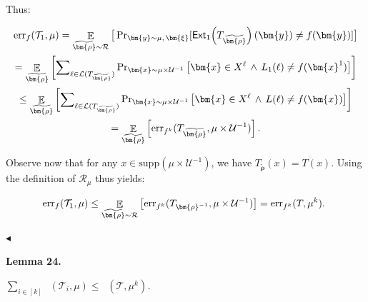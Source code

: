 Thus:\par


\[\begin{gathered}
\displaystyle\mathrm{err}_{f}(\mathcal{T}_{1},\mu) \displaystyle=\mathop{\mathbb{E}}_{\widetilde{\bm{\rho}}\sim\mathcal{R}}\big{[}\Pr\nolimits_{\bm{y}\sim\mu,\,\bm{\xi}}[\mathsf{Ext}_{1}\mathopen{}\left(T_{\widetilde{\bm{\rho}}}\mathclose{}\right)(\bm{y})\neq f(\bm{y})]\big{]} \\
\displaystyle=\mathop{\mathbb{E}}_{\widetilde{\bm{\rho}}}\left[\sum\nolimits_{\ell\in\mathcal{L}(T_{\widetilde{\bm{\rho}}})}\Pr\nolimits_{\bm{x}\sim\mu\times\mathcal{U}^{-1}}\big{[}\bm{x}\in X^{\ell}\,\wedge\,L_{1}(\ell)\neq f(\bm{x}^{1})\big{]}\right] \\
\displaystyle\leq\mathop{\mathbb{E}}_{\widetilde{\bm{\rho}}}\left[\sum\nolimits_{\ell\in\mathcal{L}(T_{\widetilde{\bm{\rho}}})}\Pr\nolimits_{\bm{x}\sim\mu\times\mathcal{U}^{-1}}\big{[}\bm{x}\in X^{\ell}\,\wedge\,L(\ell)\neq f(\bm{x})\big{]}\right] \\
\displaystyle=\mathop{\mathbb{E}}_{\widetilde{\bm{\rho}}}\left[\mathrm{err}_{f^{k}}(T_{\widetilde{\bm{\rho}}},\mu\times\mathcal{U}^{-1})\right].
\end{gathered}\]


Observe now that for any $x\in\mathrm{supp}(\mu\times\mathcal{U}^{-1})$, we have $T_{\widetilde{\bm{\rho}}}(x)=T(x)$. Using the definition of $\mathcal{R}_{\mu}$ thus yields:\par


\[\begin{gathered}
\mathrm{err}_{f}(\mathcal{T}_{1},\mu)\leq\mathop{\mathbb{E}}_{\widetilde{\bm{\rho}}\sim\mathcal{R}}\big{[}\mathrm{err}_{f^{k}}(T_{\bm{\rho}^{-1}},\mu\times\mathcal{U}^{-1})\big{]}=\mathrm{err}_{f^{k}}(T,\mu^{k}).\
\end{gathered}\]


$\blacktriangleleft$\par





\par\medskip\noindent\textbf{
\textbf{Lemma 24}\textbf{.}
}\par



$\sum_{i\in[k]}\mathop{\overline{sq}}(\mathcal{T}_{i},\mu)\leq\mathop{\overline{sq}}(\mathcal{T},\mu^{k})$\emph{.}\par



